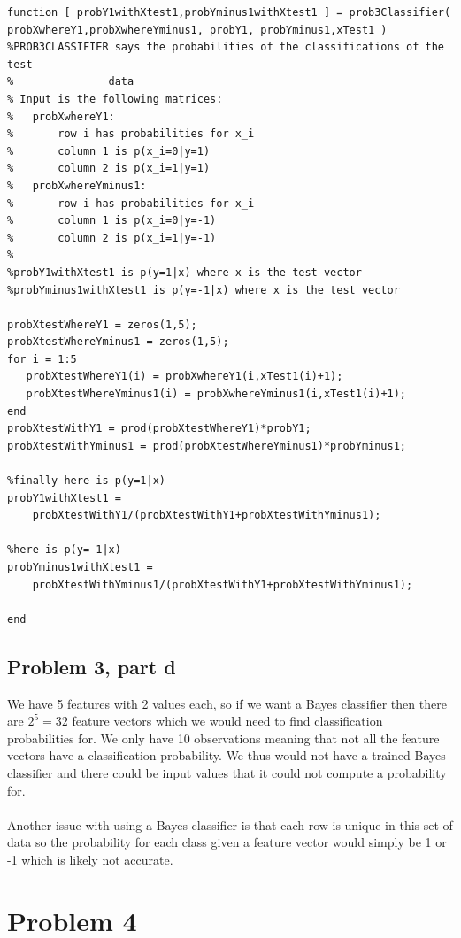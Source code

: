 \documentclass[11pt,psfig]{article}
\begin{document}
\begin{verbatim}
function [ probY1withXtest1,probYminus1withXtest1 ] = prob3Classifier( 
probXwhereY1,probXwhereYminus1, probY1, probYminus1,xTest1 )
%PROB3CLASSIFIER says the probabilities of the classifications of the test
%               data
% Input is the following matrices:
%   probXwhereY1:
%       row i has probabilities for x_i
%       column 1 is p(x_i=0|y=1)
%       column 2 is p(x_i=1|y=1)
%   probXwhereYminus1:
%       row i has probabilities for x_i
%       column 1 is p(x_i=0|y=-1)
%       column 2 is p(x_i=1|y=-1)
%
%probY1withXtest1 is p(y=1|x) where x is the test vector
%probYminus1withXtest1 is p(y=-1|x) where x is the test vector

probXtestWhereY1 = zeros(1,5);
probXtestWhereYminus1 = zeros(1,5);
for i = 1:5
   probXtestWhereY1(i) = probXwhereY1(i,xTest1(i)+1); 
   probXtestWhereYminus1(i) = probXwhereYminus1(i,xTest1(i)+1); 
end
probXtestWithY1 = prod(probXtestWhereY1)*probY1;
probXtestWithYminus1 = prod(probXtestWhereYminus1)*probYminus1;

%finally here is p(y=1|x)
probY1withXtest1 = 
    probXtestWithY1/(probXtestWithY1+probXtestWithYminus1);

%here is p(y=-1|x)
probYminus1withXtest1 = 
    probXtestWithYminus1/(probXtestWithY1+probXtestWithYminus1);

end
\end{verbatim}

\newpage

\subsection*{Problem 3, part d}

We have 5 features with 2 values each, so if we want a Bayes classifier then there are $2^5=32$ feature vectors which we would need to find classification probabilities for. We only have 10 observations meaning that not all the feature vectors have a classification probability. We thus would not have a trained Bayes classifier and there could be input values that it could not compute a probability for.\\
\\
Another issue with using a Bayes classifier is that each row is unique in this set of data so the probability for each class given a feature vector would simply be 1 or -1 which is likely not accurate.

\newpage

\section*{Problem 4}
\end{document}
